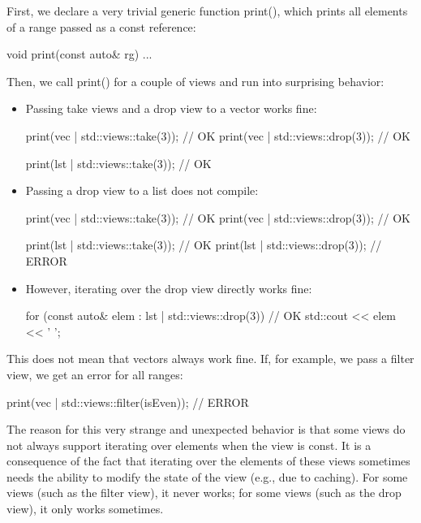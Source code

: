 First, we declare a very trivial generic function print(), which prints all elements of a range passed as a const reference:

\begin{cpp}
void print(const auto& rg)
{
	...
}
\end{cpp}

Then, we call print() for a couple of views and run into surprising behavior:


\begin{itemize}
\item
Passing take views and a drop view to a vector works fine:

\begin{cpp}
print(vec | std::views::take(3)); // OK
print(vec | std::views::drop(3)); // OK

print(lst | std::views::take(3)); // OK
\end{cpp}

\item
Passing a drop view to a list does not compile:

\begin{cpp}
print(vec | std::views::take(3)); // OK
print(vec | std::views::drop(3)); // OK

print(lst | std::views::take(3)); // OK
print(lst | std::views::drop(3)); // ERROR
\end{cpp}

\item
However, iterating over the drop view directly works fine:

\begin{cpp}
for (const auto& elem : lst | std::views::drop(3)) { // OK
	std::cout << elem << ' ';
}
\end{cpp}
\end{itemize}

This does not mean that vectors always work fine. If, for example, we pass a filter view, we get an error for all ranges:

\begin{cpp}
print(vec | std::views::filter(isEven)); // ERROR
\end{cpp}


The reason for this very strange and unexpected behavior is that some views do not always support iterating over elements when the view is const. It is a consequence of the fact that iterating over the elements of these views sometimes needs the ability to modify the state of the view (e.g., due to caching). For some views (such as the filter view), it never works; for some views (such as the drop view), it only works sometimes.

